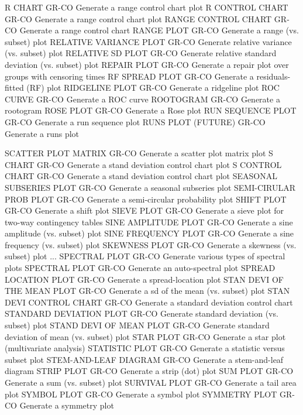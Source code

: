 R CHART                     GR-CO Generate a range control chart plot
R CONTROL CHART             GR-CO Generate a range control chart plot
RANGE CONTROL CHART         GR-CO Generate a range control chart
RANGE PLOT                  GR-CO Generate a range (vs. subset) plot
RELATIVE VARIANCE PLOT      GR-CO Generate relative variance (vs. subset) plot
RELATIVE SD PLOT            GR-CO Generate relative standard deviation (vs. subset) plot
REPAIR PLOT                 GR-CO Generate a repair plot over groups with censoring times
RF SPREAD PLOT              GR-CO Generate a residuals-fitted (RF)  plot
RIDGELINE PLOT              GR-CO Generate a ridgeline plot
ROC CURVE                   GR-CO Generate a ROC curve
ROOTOGRAM                   GR-CO Generate a rootogram
ROSE PLOT                   GR-CO Generate a Rose plot
RUN SEQUENCE PLOT           GR-CO Generate a run sequence plot
RUNS PLOT (FUTURE)          GR-CO Generate a runs plot

SCATTER PLOT MATRIX         GR-CO Generate a scatter plot matrix plot
S CHART                     GR-CO Generate a stand deviation control chart plot
S CONTROL CHART             GR-CO Generate a stand deviation control chart plot
SEASONAL SUBSERIES PLOT     GR-CO Generate a seasonal subseries plot
SEMI-CIRULAR PROB PLOT      GR-CO Generate a semi-circular probability plot
SHIFT PLOT                  GR-CO Generate a shift plot
SIEVE PLOT                  GR-CO Generate a sieve plot for two-way contingency tables
SINE AMPLITUDE PLOT         GR-CO Generate a sine amplitude (vs. subset) plot
SINE FREQUENCY PLOT         GR-CO Generate a sine frequency (vs. subset) plot
SKEWNESS PLOT               GR-CO Generate a skewness (vs. subset) plot
... SPECTRAL PLOT           GR-CO Generate various types of spectral plots
SPECTRAL PLOT               GR-CO Generate an auto-spectral plot
SPREAD LOCATION PLOT        GR-CO Generate a spread-location plot
STAN DEVI OF THE MEAN PLOT  GR-CO Generate a sd of the mean (vs. subset) plot
STAN DEVI CONTROL CHART     GR-CO Generate a standard deviation control chart
STANDARD DEVIATION PLOT     GR-CO Generate standard deviation (vs. subset) plot
STAND DEVI OF MEAN PLOT     GR-CO Generate standard deviation of mean (vs. subset) plot
STAR PLOT                   GR-CO Generate a star plot (multivariate analysis)
STATISTIC PLOT              GR-CO Generate a statistic versus subset plot
STEM-AND-LEAF DIAGRAM       GR-CO Generate a stem-and-leaf diagram
STRIP PLOT                  GR-CO Generate a strip (dot) plot
SUM PLOT                    GR-CO Generate a sum (vs. subset) plot
SURVIVAL PLOT               GR-CO Generate a tail area plot
SYMBOL PLOT                 GR-CO Generate a symbol plot
SYMMETRY PLOT               GR-CO Generate a symmetry plot

